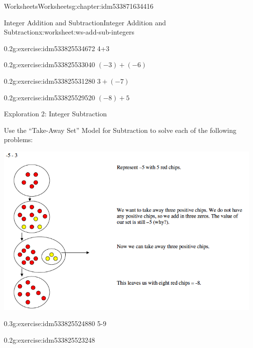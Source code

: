 \documentclass[twoside,11pt,]{book}
\begin{document}
\begin{chapterptx}{Worksheets}{}{Worksheets}{}{}{g:chapter:idm533871634416}
\begin{worksheet-section-numberless}{Integer Addition and Subtraction}{}{Integer Addition and Subtraction}{}{}{x:worksheet:ws-add-sub-integers}
\begin{introduction}{}
\begin{sidebyside}{1}{0}{0}{0}
\begin{sbspanel}{1}
\end{sbspanel}%
\end{sidebyside}%
%
\end{introduction}%
\begin{divisionexercise}{1}{}{0.2}{g:exercise:idm533825534672}%
4+3%
\end{divisionexercise}%
\clearpage
\begin{divisionexercise}{2}{}{0.2}{g:exercise:idm533825533040}%
\((-3)+(-6) \)%
\end{divisionexercise}%
\begin{divisionexercise}{3}{}{0.2}{g:exercise:idm533825531280}%
\(3+(-7) \)%
\end{divisionexercise}%
\begin{divisionexercise}{4}{}{0.2}{g:exercise:idm533825529520}%
\((-8)+ 5 \)%
\end{divisionexercise}%
\clearpage
\begin{introduction}{}%
Exploration 2: Integer Subtraction%
\par
Use the ``Take-Away Set'' Model for Subtraction to solve each of the following problems: \begin{sidebyside}{1}{0}{0}{0}%
\begin{sbspanel}{1}%
\includegraphics[width=1\linewidth]{images/integer-sub-model.png}
\end{sbspanel}%
\end{sidebyside}%
%
\end{introduction}%
\begin{divisionexercise}{5}{}{0.3}{g:exercise:idm533825524880}%
5-9%
\end{divisionexercise}%
\clearpage
\begin{divisionexercise}{6}{}{0.2}{g:exercise:idm533825523248}%

\end{divisionexercise}
\end{worksheet-section-numberless}
\end{chapterptx}
\end{document}
